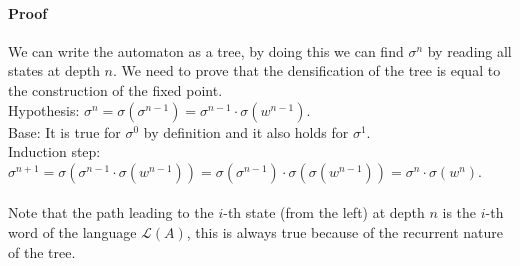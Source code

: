 \documentclass{article}
\begin{document}
\paragraph{Proof}
We can write the automaton as a tree, by doing this we can find $\sigma^n$ by
reading all states at depth $n$. We need to prove that the densification of
the tree is equal to the construction of the fixed point.\\
Hypothesis: 
$\sigma^n = \sigma(\sigma^{n - 1}) = \sigma^{n - 1} \cdot \sigma(w^{n - 1})$.\\
Base: It is true for $\sigma^0$ by definition and it also holds for 
$\sigma^1$.\\
Induction step: 
$\sigma^{n + 1} = \sigma(\sigma^{n - 1} \cdot \sigma(w^{n - 1})) =
\sigma(\sigma^{n - 1}) \cdot \sigma(\sigma(w^{n - 1})) =
\sigma^n \cdot \sigma(w^n)$.\\
\\
Note that the path leading to the $i$-th state (from the left) at depth $n$ 
is the $i$-th word of the language $\mathcal{L}(A)$, this is always true 
because of the recurrent nature of the tree.
\end{document}
